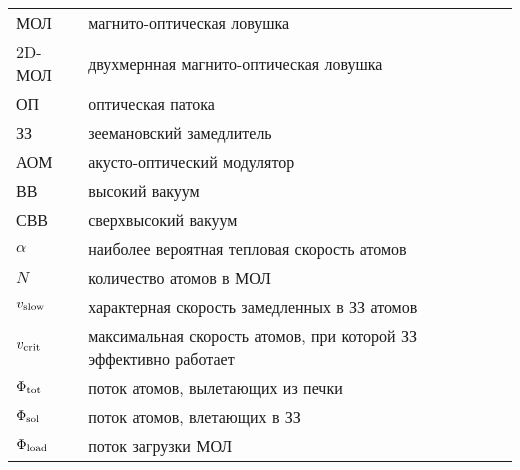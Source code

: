 

 
\begin{tabular}{lll}
	МОЛ & магнито-оптическая ловушка & \pageref{subsec:мол} \\ 
	2D-МОЛ  & двухмернная магнито-оптическая ловушка & \\ 
	ОП  & оптическая патока & \\ 
	ЗЗ & зеемановский замедлитель & \\
	АОМ & акусто-оптический модулятор & \\
	ВВ & высокий вакуум & \\
	СВВ & сверхвысокий вакуум & \\
	$\alpha$ & наиболее вероятная тепловая скорость атомов & \pageref{Поток атомов на выходе}\\ 
	$N$ & количество атомов в МОЛ & \\
	$v_{\textnormal{slow}}$ &  характерная скорость замедленных в ЗЗ атомов & \pageref{Тормозящая сила} \\
	$v_{\textnormal{crit}}$ & максимальная скорость атомов, при которой ЗЗ эффективно работает  & \pageref{Тормозящая сила} \\
	$\Phi_{\textnormal{tot}}$ & поток атомов, вылетающих из печки & \\
	$\Phi_{\textnormal{sol}}$ & поток атомов, влетающих в ЗЗ & \pageref{Поток атомов на выходе} \\
	$\Phi_{\textnormal{load}}$ & поток загрузки МОЛ & \pageref{Динамика количества атомов в МОЛ} \\
\end{tabular}

